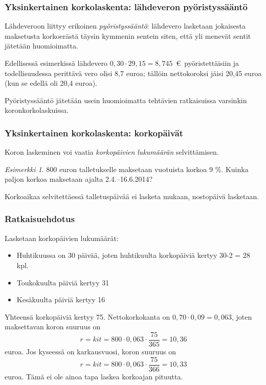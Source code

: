 \documentclass{beamer}\usepackage[]{graphicx}\usepackage[]{color}
\theoremstyle{remark}
\newtheorem{esim}{Esimerkki}
\begin{document}
\begin{frame}
    \frametitle{Yksinkertainen korkolaskenta: lähdeveron pyöristyssääntö}
    
    \pause
    Lähdeveroon liittyy erikoinen \emph{pyöristyssääntö}:\pause 
    lähdevero lasketaan jokaisesta maksetusta korkoerästä täysin kymmenin sentein siten,
    että yli menevät sentit jätetään huomioimatta.
    \pause
    \begin{block}{}
        Edellisessä esimerkissä lähdevero \(0,30\cdot29{,}15 = 8{,}745\)~\euro\ pyöristettäisiin ja todellisuudessa perittävä vero olisi 8{,}7 euroa; tällöin nettokoroksi jäisi 20{,}45 euroa (kun se edellä oli 20{,}4 euroa).
    \end{block}
    \pause
    Pyöristyssääntö jätetään usein huomioimatta tehtävien ratkaisuissa varsinkin koronkorkolaskuissa.
\end{frame}

\begin{frame}
    \frametitle{Yksinkertainen korkolaskenta: korkopäivät}
    \pause
    Koron laskeminen voi vaatia \emph{korkopäivien lukumäärän} selvittämisen.
    \pause
    \begin{esim}
        800 euron talletukselle maksetaan vuotuista korkoa 9 \%. Kuinka paljon korkoa maksetaan ajalta 2.4.--16.6.2014?
    \end{esim}
    \pause
    Korkoaikaa selvitettäessä talletuspäivää ei lasketa mukaan, nostopäivä lasketaan.
\end{frame}

\begin{frame}
    \frametitle{Ratkaisuehdotus}
    Lasketaan korkopäivien lukumäärät:\pause
    \begin{itemize}
        \item Huhtikuussa on 30 päivää, joten huhtikuulta korkopäiviä kertyy 30-2 = 28 kpl.\pause
        \item Toukokuulta päiviä kertyy 31\pause
        \item Kesäkuulta päiviä kertyy 16
    \end{itemize}
    Yhteensä korkopäiviä kertyy 75. Nettokorkokanta on \(0,70\cdot0,09 = 0,063\), joten maksettavan koron suuruus on\pause
    \[
        r = kit = 800\cdot 0,063\cdot \frac{75}{365} = 10,36
    \]
    euroa. \pause Jos kyseessä on karkausvuosi, koron suuruus on
    \[
        r = kit = 800\cdot 0,063\cdot \frac{75}{366} = 10,33
    \]
    euroa. \pause Tämä ei ole ainoa tapa laskea korkoajan pituutta.
\end{frame}
\end{document}
